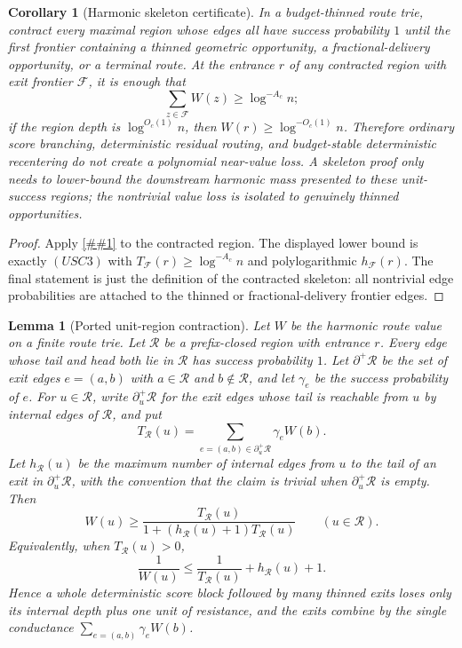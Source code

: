 \documentclass[10pt]{article}
\newcommand{\cref}[1]{\ref{##1}}
\newtheorem{lemma}[theorem]{Lemma}
\newtheorem{corollary}[theorem]{Corollary}
\theoremstyle{definition}
\begin{document}
\begin{corollary}[Harmonic skeleton certificate]
   \label{cor:harmonic-skeleton-certificate}
   In a budget-thinned route trie, contract every maximal region whose edges
   all have success probability \(1\) until the first frontier containing a
   thinned geometric opportunity, a fractional-delivery opportunity, or a
   terminal route.  At the entrance \(r\) of any contracted region with exit
   frontier \(\mathcal F\), it is enough that
   \[
      \sum_{z\in\mathcal F} W(z)\ge \log^{-A_c}n ;
   \]
   if the region depth is \(\log^{O_c(1)}n\), then
   \(W(r)\ge\log^{-O_c(1)}n\).  Therefore ordinary score branching,
   deterministic residual routing, and budget-stable deterministic recentering
   do not create a polynomial near-value loss.  A skeleton proof only needs to
   lower-bound the downstream harmonic mass presented to these unit-success
   regions; the nontrivial value loss is isolated to genuinely thinned
   opportunities.
\end{corollary}

\begin{proof}
   Apply \cref{lem:unit-success-skeleton-contraction} to the contracted region.
   The displayed lower bound is exactly \((USC3)\) with
   \(T_{\mathcal F}(r)\ge\log^{-A_c}n\) and polylogarithmic
   \(h_{\mathcal F}(r)\).  The final statement is just the definition of the
   contracted skeleton: all nontrivial edge probabilities are attached to the
   thinned or fractional-delivery frontier edges.
\end{proof}

\begin{lemma}[Ported unit-region contraction]
   \label{lem:ported-unit-region-contraction}
   Let \(W\) be the harmonic route value on a finite route trie.  Let
   \(\mathcal R\) be a prefix-closed region with entrance \(r\).  Every edge
   whose tail and head both lie in \(\mathcal R\) has success probability
   \(1\).  Let \(\partial^+\mathcal R\) be the set of exit edges
   \(e=(a,b)\) with \(a\in\mathcal R\) and \(b\notin\mathcal R\), and let
   \(\gamma_e\) be the success probability of \(e\).  For \(u\in\mathcal R\),
   write \(\partial^+_u\mathcal R\) for the exit edges whose tail is
   reachable from \(u\) by internal edges of \(\mathcal R\), and put
   \[
      T_{\mathcal R}(u)
      =
      \sum_{e=(a,b)\in\partial^+_u\mathcal R}
      \gamma_e W(b).
   \]
   Let \(h_{\mathcal R}(u)\) be the maximum number of internal edges from
   \(u\) to the tail of an exit in \(\partial^+_u\mathcal R\), with the
   convention that the claim is trivial when \(\partial^+_u\mathcal R\) is
   empty.  Then
   \[
      W(u)
      \ge
      \frac{T_{\mathcal R}(u)}
           {1+(h_{\mathcal R}(u)+1)T_{\mathcal R}(u)}
      \qquad(u\in\mathcal R).
      \tag{PU1}
   \]
   Equivalently, when \(T_{\mathcal R}(u)>0\),
   \[
      \frac1{W(u)}
      \le
      \frac1{T_{\mathcal R}(u)}+h_{\mathcal R}(u)+1.
      \tag{PU2}
   \]
   Hence a whole deterministic score block followed by many thinned exits
   loses only its internal depth plus one unit of resistance, and the exits
   combine by the single conductance
   \(\sum_{e=(a,b)}\gamma_eW(b)\).
\end{lemma}
\end{document}
